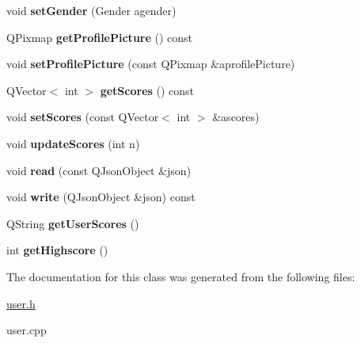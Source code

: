 \begin{DoxyCompactItemize}
void {\bfseries set\+Gender} (Gender agender)
\item 
\mbox{\label{classUser_ae0c725301120ba11ad6ecc3cd5a31fe4}} 
Q\+Pixmap {\bfseries get\+Profile\+Picture} () const
\item 
\mbox{\label{classUser_a41b2a36ee7375bda92e1bb9409dbba1f}} 
void {\bfseries set\+Profile\+Picture} (const Q\+Pixmap \&aprofile\+Picture)
\item 
\mbox{\label{classUser_a49daa06b0146027bc8759fdc3924ffd6}} 
Q\+Vector$<$ int $>$ {\bfseries get\+Scores} () const
\item 
\mbox{\label{classUser_af411720e363e1b2cf7b56dbd79cdbb84}} 
void {\bfseries set\+Scores} (const Q\+Vector$<$ int $>$ \&ascores)
\item 
\mbox{\label{classUser_afd5f6a0639eb998b154ba0db51cbea62}} 
void {\bfseries update\+Scores} (int n)
\item 
\mbox{\label{classUser_ab12a51628183409d7ca7254fc67d7fbf}} 
void {\bfseries read} (const Q\+Json\+Object \&json)
\item 
\mbox{\label{classUser_af5388978540e145bacbbbf5859461ac5}} 
void {\bfseries write} (Q\+Json\+Object \&json) const
\item 
\mbox{\label{classUser_add9b503c80e42dae4c2a48dfd4f10d52}} 
Q\+String {\bfseries get\+User\+Scores} ()
\item 
\mbox{\label{classUser_a2c6070a1c31020a6beae27e4fe4f4724}} 
int {\bfseries get\+Highscore} ()
\end{DoxyCompactItemize}


The documentation for this class was generated from the following files\+:\begin{DoxyCompactItemize}
\item 
\hyperlink{user_8h}{user.\+h}\item 
user.\+cpp\end{DoxyCompactItemize}
